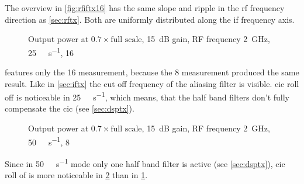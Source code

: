 \documentclass[12pt,a4paper,parskip=full,abstracton]{scrartcl}
\begin{document}
The overview in \cref{fig:rfiftx16} has the same slope and ripple
in the \gls{rf} frequency direction as \cref{sec:rftx}. Both are uniformly
distributed along the \gls{if} frequency axis.

\begin{figure}[htb]
    \centering
{}
    \caption{Output power at $0.7 \times \text{full scale}$, \SI{15}{\deci\bel} gain, RF frequency \SI{2}{\giga\hertz}, \SI{25}{\mega\samples\per\second}, \SI{16}{\bit}}
    \label{fig:iftx}
\end{figure}

 features only the \SI{16}{\bit} measurement, because the \SI{8}{\bit}
measurement produced the same result. Like in \cref{sec:iftx} the cut off frequency
of the aliasing filter is visible. \gls{cic} roll off is noticeable in
\SI{25}{\mega\samples\per\second}, which means, that the half band filters don't fully
compensate the \gls{cic} (see \cref{sec:dsptx}).

\begin{figure}[htb]
    \centering
{}
    \caption{Output power at $0.7 \times \text{full scale}$, \SI{15}{\deci\bel} gain, RF frequency \SI{2}{\giga\hertz}, \SI{50}{\mega\samples\per\second}, \SI{8}{\bit}}
    \label{fig:iftx50}
\end{figure}

Since in \SI{50}{\mega\samples\per\second} mode only one half band filter
is active (see \cref{sec:dsptx}), \gls{cic} roll of is more noticeable in
\cref{fig:iftx50} than in \cref{fig:iftx}.
\end{document}
